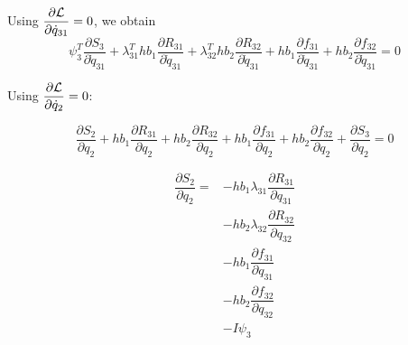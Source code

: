 \documentclass[10pt,letter]{book}
\newcommand{\pd}[2]{\dfrac{\partial #1}{\partial #2}}
\begin{document}
     Using $\pd{{\cal L}}{\dot{q}_{31}}=0$, we obtain
     $$ 
     \psi_3^T \pd{S_3}{\dot{q}_{31}} 
     + \lambda_{31}^T hb_1\pd{R_{31}}{\dot{q}_{31}} 
     + \lambda_{32}^T hb_2\pd{R_{32}}{\dot{q}_{31}} 
     + hb_1\pd{f_{31}}{\dot{q}_{31}} 
     + hb_2\pd{f_{32}}{\dot{q}_{31}} = 0 
     $$

     Using $\pd{{\cal L}}{\dot{q}_{2}}=0$:

     \begin{equation}\nonumber
       \pd{S_2}{{q}_{2}}    + hb_1\pd{R_{31}}{q_2} + hb_2 \pd{R_{32}}{q_2} +
       hb_1\pd{f_{31}}{q_2} + hb_2\pd{f_{32}}{q_2} +\pd{S_3}{q_2} = 0
     \end{equation}

     \begin{equation}\nonumber
       \begin{split}
         \pd{S_2}{q_2}  =  & - hb_1\lambda_{31} \pd{R_{31}}{q_{31}} \\
         &- hb_2 \lambda_{32} \pd{R_{32}}{q_{32}} \\
         &- hb_1\pd{f_{31}}{q_{31}} \\ 
         &- hb_2\pd{f_{32}}{q_{32}} \\ 
         &- I \psi_3
       \end{split}
     \end{equation}
     

\end{document}
